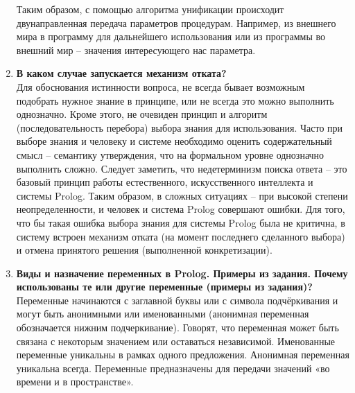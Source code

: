 \begin{enumerate}
    Таким образом, с помощью алгоритма унификации происходит двунаправленная передача параметров процедурам. Например, из внешнего мира в программу для дальнейшего использования или из программы во внешний мир – значения интересующего нас параметра. 
    
    
    
    \item \textbf{В каком случае запускается механизм отката?}\\
    Для обоснования истинности вопроса, не всегда бывает возможным подобрать нужное знание в принципе, или не всегда это можно выполнить однозначно. Кроме этого, не очевиден принцип и алгоритм (последовательность перебора) выбора знания для использования. Часто при выборе знания  и человеку и системе необходимо оценить содержательный смысл – семантику утверждения, что на формальном уровне однозначно выполнить сложно. Следует заметить, что недетерминизм поиска ответа – это базовый принцип работы естественного, искусственного интеллекта и системы Prolog. Таким образом, в сложных ситуациях – при высокой степени неопределенности, и человек и система Prolog совершают ошибки. Для того, что бы такая ошибка выбора знания для системы Prolog была не критична, в систему встроен механизм отката (на момент последнего сделанного выбора) и отмена принятого решения (выполненной конкретизации).
    
    \item \textbf{Виды и назначение переменных в Prolog. Примеры из задания.  Почему использованы те или другие переменные (примеры из задания)?}\\
    Переменные начинаются с заглавной буквы или с символа подчёркивания и могут быть анонимными или именованными (анонимная переменная обозначается нижним подчеркивание). Говорят, что переменная может быть связана с некоторым значением или оставаться независимой. Именованные переменные уникальны в рамках одного предложения. Анонимная переменная уникальна всегда. Переменные предназначены для передачи значений «во времени и в пространстве».

\end{enumerate}

